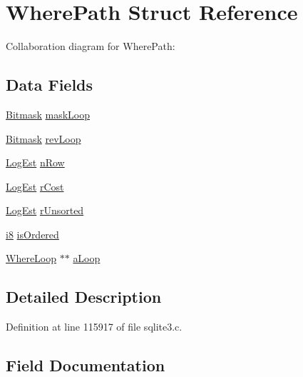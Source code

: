 \hypertarget{struct_where_path}{}\section{Where\+Path Struct Reference}
\label{struct_where_path}


Collaboration diagram for Where\+Path\+:
\subsection*{Data Fields}
\begin{DoxyCompactItemize}
\item 
\hyperlink{sqlite3_8c_afa77b629897c4457bfdc47d364ba5c3f}{Bitmask} \hyperlink{struct_where_path_a911f96b00bf431e028e1f415b4212fb2}{mask\+Loop}
\item 
\hyperlink{sqlite3_8c_afa77b629897c4457bfdc47d364ba5c3f}{Bitmask} \hyperlink{struct_where_path_a1cd81ce561c7c4c4080875ba1c6a00cb}{rev\+Loop}
\item 
\hyperlink{sqlite3_8c_aa0f9b3b63ad120ac15b96785b05ce733}{Log\+Est} \hyperlink{struct_where_path_a2e37b751d04e575b291dfdac16e91b5a}{n\+Row}
\item 
\hyperlink{sqlite3_8c_aa0f9b3b63ad120ac15b96785b05ce733}{Log\+Est} \hyperlink{struct_where_path_ab5f3fd4b1eee3cad50a4540cc2452e7a}{r\+Cost}
\item 
\hyperlink{sqlite3_8c_aa0f9b3b63ad120ac15b96785b05ce733}{Log\+Est} \hyperlink{struct_where_path_a1a049427d4fee27af69080f248efbef0}{r\+Unsorted}
\item 
\hyperlink{sqlite3_8c_ad11a1324ecade336dc6ce17a20cf6617}{i8} \hyperlink{struct_where_path_af9174dc8e7056e94c539611eeb036d8d}{is\+Ordered}
\item 
\hyperlink{struct_where_loop}{Where\+Loop} $\ast$$\ast$ \hyperlink{struct_where_path_a291ccde6c9d7d9d841fd5559254c5e12}{a\+Loop}
\end{DoxyCompactItemize}


\subsection{Detailed Description}


Definition at line 115917 of file sqlite3.\+c.



\subsection{Field Documentation}
\hypertarget{struct_where_path_a291ccde6c9d7d9d841fd5559254c5e12}{}
